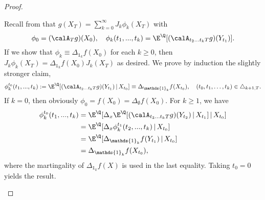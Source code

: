 \begin{proof}
\begin{enumerate}
Recall from  that $g(X_T) = \sum_{k=0}^{\infty} J_k \phi_k (X_T)$ with
$$\phi_0 = (\calA_T g)(X_0) , \quad   \phi_k(t_1,...,t_k) = \E^{\Q}[(\calA_{t_2...t_kT}g)(Y_{t_1})].$$
If we show that  $\phi_k \equiv \Delta_{\mathds{1}_k}f(X_0)$   for each $k\ge 0$, then 
$J_k \phi_k (X_T) = \Delta_{\mathds{1}_k}f(X_0) J_k(X_T)$ as desired. %
We  prove by induction the slightly stronger claim, 
$$\phi^{t_0}_k(t_1,...,t_k) := \E^{\Q}[(\calA_{t_2...t_kT}g)(Y_{t_1})\,|\, X_{t_0}] \equiv \Delta_{\mathds{1}_k}f(X_{t_0}), \quad (t_0,t_1,\ldots,t_k)\in \triangle_{k+1,T}.$$
If $k=0$, then obviously $\phi_0 = f(X_0) = \Delta_{\emptyset} f(X_0) $. For $k\ge 1$,  we have
\begin{align*}
\phi^{t_0}_k(t_1,...,t_k) %
    &= \E^{\Q}[\Delta_x \E^{\Q}[(\calA_{t_3...t_kT}g)(Y_{t_2})\,|\, X_{t_1}]\,|\, X_{t_0} ]\\
    &= \E^{\Q}[\Delta_x \phi^{t_1}_k(t_2,...,t_k)\,|\, X_{t_0} ]\\
    &= \E^{\Q}[ \Delta_{\mathds{1}_k}f(Y_{t_1})\,|\, X_{t_0} ]\\
    &=  \Delta_{\mathds{1}_k}f(X_{t_0}),
\end{align*}
where the martingality of $\Delta_{\mathds{1}_k}f(X)$  is used in the last equality.  Taking $t_0=0$ yields the result.
\end{enumerate}


\end{proof}





